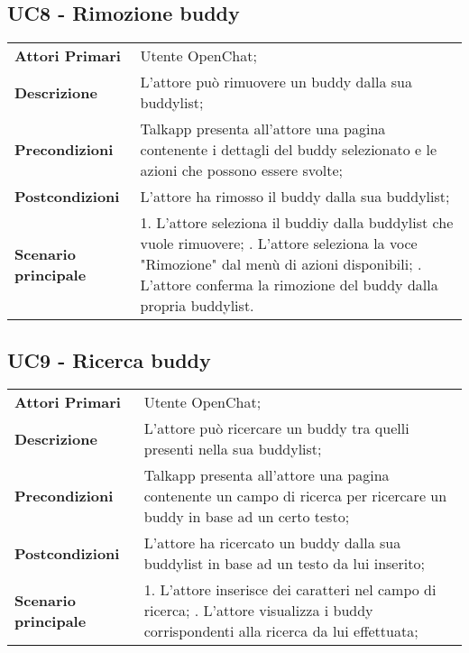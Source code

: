 \subsection{UC8 - Rimozione buddy}
	\begin{center}
	\bgroup
	\def\arraystretch{1.8}     
	\begin{longtable}{  p{4cm} | p{9.5cm} } 
		\textbf{Attori Primari} & Utente OpenChat; \\ 
		\textbf{Descrizione} &  L'attore può rimuovere un buddy dalla sua buddylist; \\ 
		\textbf{Precondizioni}  & Talkapp presenta all'attore una pagina contenente i dettagli del buddy selezionato e le azioni che possono essere svolte; \\
		\textbf{Postcondizioni} & L'attore ha rimosso il buddy dalla sua buddylist;  \\ 
		\textbf{Scenario principale} & 
		1. L'attore seleziona il buddiy dalla buddylist che vuole rimuovere; \newline
		2. L'attore seleziona la voce "Rimozione" dal menù di azioni disponibili; \newline
		3. L'attore conferma la rimozione del buddy dalla propria buddylist.
	\end{longtable}
	\egroup
\end{center}

\subsection{UC9 - Ricerca buddy}
	\begin{center}
	\bgroup
	\def\arraystretch{1.8}     
	\begin{longtable}{  p{4cm} | p{9.5cm} } 
		\textbf{Attori Primari} & Utente OpenChat; \\ 
		\textbf{Descrizione} &  L'attore può ricercare un  buddy tra quelli presenti nella sua buddylist; \\ 
		\textbf{Precondizioni}  & Talkapp presenta all'attore una pagina contenente un campo di ricerca per ricercare un buddy in base ad un certo testo; \\
		\textbf{Postcondizioni} & L'attore ha ricercato un buddy dalla sua buddylist in base ad un testo da lui inserito;  \\ 
		\textbf{Scenario principale} & 
		1. L'attore inserisce dei caratteri nel campo di ricerca; \newline
		2. L'attore visualizza i buddy corrispondenti alla ricerca da lui effettuata;
	\end{longtable}
	\egroup
\end{center}

